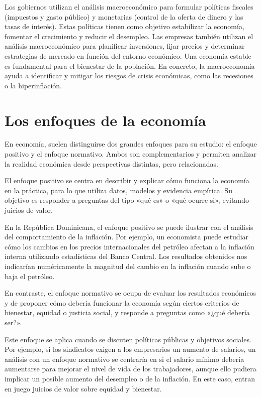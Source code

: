 \documentclass[
  letterpaper,
  DIV=11,
  numbers=noendperiod,
  oneside]{scrreprt}
\begin{document}
Los gobiernos utilizan el análisis macroeconómico para formular
políticas fiscales (impuestos y gasto público) y monetarias (control de
la oferta de dinero y las tasas de interés). Estas políticas tienen como
objetivo estabilizar la economía, fomentar el crecimiento y reducir el
desempleo. Las empresas también utilizan el análisis macroeconómico para
planificar inversiones, fijar precios y determinar estrategias de
mercado en función del entorno económico. Una economía estable es
fundamental para el bienestar de la población. En concreto, la
macroeconomía ayuda a identificar y mitigar los riesgos de crisis
económicas, como las recesiones o la hiperinflación.

\section{Los enfoques de la
economía}\label{los-enfoques-de-la-economuxeda}

En economía, suelen distinguirse dos grandes enfoques para su estudio:
el enfoque positivo y el enfoque normativo. Ambos son complementarios y
permiten analizar la realidad económica desde perspectivas distintas,
pero relacionadas.

El enfoque positivo se centra en describir y explicar cómo funciona la
economía en la práctica, para lo que utiliza datos, modelos y evidencia
empírica. Su objetivo es responder a preguntas del tipo «qué es» o «qué
ocurre si», evitando juicios de valor.

En la República Dominicana, el enfoque positivo se puede ilustrar con el
análisis del comportamiento de la inflación. Por ejemplo, un economista
puede estudiar cómo los cambios en los precios internacionales del
petróleo afectan a la inflación interna utilizando estadísticas del
Banco Central. Los resultados obtenidos nos indicarían numéricamente la
magnitud del cambio en la inflación cuando sube o baja el petróleo.

En contraste, el enfoque normativo se ocupa de evaluar los resultados
económicos y de proponer cómo debería funcionar la economía según
ciertos criterios de bienestar, equidad o justicia social, y responde a
preguntas como «¿qué debería ser?».

Este enfoque se aplica cuando se discuten políticas públicas y objetivos
sociales. Por ejemplo, si los sindicatos exigen a los empresarios un
aumento de salarios, un análisis con un enfoque normativo se centraría
en si el salario mínimo debería aumentarse para mejorar el nivel de vida
de los trabajadores, aunque ello pudiera implicar un posible aumento del
desempleo o de la inflación. En este caso, entran en juego juicios de
valor sobre equidad y bienestar.
\end{document}
